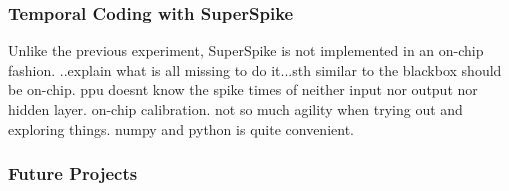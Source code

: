 \subsubsection{Temporal Coding with SuperSpike}
Unlike the previous experiment, SuperSpike is not implemented in an on-chip fashion. ..explain what is all missing to do it...sth similar to the blackbox should be on-chip. ppu doesnt know the spike times of neither input nor output nor hidden layer. on-chip calibration. not so much agility when trying out and exploring things. numpy and python is quite convenient.
\subsubsection*{Future Projects}
\label{futureprojects}

